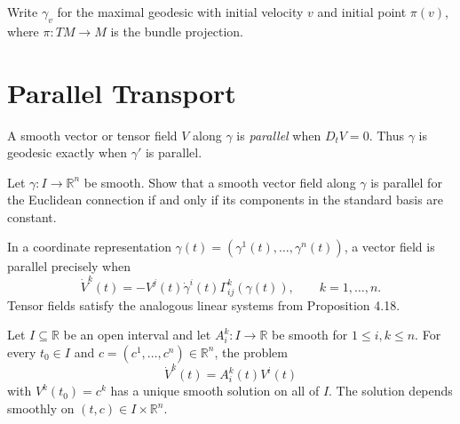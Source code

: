 Write $\gamma_v$ for the maximal geodesic with initial velocity $v$ and initial
point $\pi(v)$, where $\pi\colon TM\to M$ is the bundle projection.

\section{Parallel Transport}

A smooth vector or tensor field $V$ along $\gamma$ is \emph{parallel} when
$D_tV=0$. Thus $\gamma$ is geodesic exactly when $\gamma'$ is parallel.

\begin{exercise}
\label{exer:parallel-vector-field-euclidean-connection}
Let $\gamma\colon I\to\mathbb R^n$ be smooth. Show that a smooth vector field
along $\gamma$ is parallel for the Euclidean connection if and only if its
components in the standard basis are constant.
\end{exercise}

In a coordinate representation $\gamma(t)=(\gamma^1(t),\ldots,\gamma^n(t))$,
a vector field is parallel precisely when
\begin{equation}
\dot V^k(t)=-V^j(t)\dot\gamma^i(t)\Gamma^k_{ij}(\gamma(t)),
\qquad k=1,\ldots,n. \tag{4.19}
\end{equation}
Tensor fields satisfy the analogous linear systems from Proposition 4.18.

\begin{theorem}
\label{thm:linear-ode-existence-uniqueness}
Let $I\subseteq\mathbb R$ be an open interval and let
$A_i^k\colon I\to\mathbb R$ be smooth for $1\leq i,k\leq n$. For every
$t_0\in I$ and $c=(c^1,\ldots,c^n)\in\mathbb R^n$, the problem
\begin{equation}
\dot V^k(t)=A_i^k(t)V^i(t) \tag{4.20}
\end{equation}
with $V^k(t_0)=c^k$ has a unique smooth solution on all of $I$. The solution
depends smoothly on $(t,c)\in I\times\mathbb R^n$.
\end{theorem}

